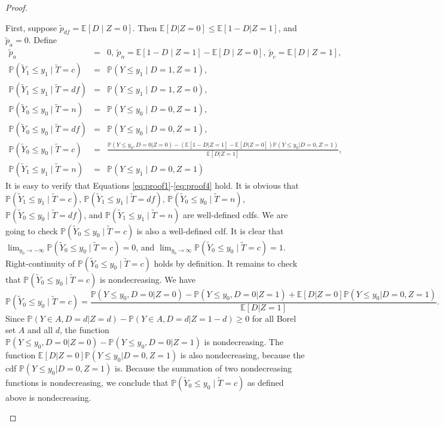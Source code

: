 \documentclass[12pt]{article}
\theoremstyle{plain}
\theoremstyle{definition}
\theoremstyle{remark}
\begin{document}
\begin{proof}
\begin{enumerate}
    First, suppose $\tilde{p}_{df}=\mathbb E[D \mid Z=0]$. Then $\mathbb{E}[D  \vert  Z=0] \leq \mathbb{E}[1-D  \vert  Z=1]$, and $\tilde{p}_a=0$. Define
\begin{eqnarray*}
\tilde{p}_a &=& 0, \ \tilde{p}_n=\mathbb E[1-D \mid Z=1]-\mathbb E[D \mid Z=0], \ \tilde{p}_c=\mathbb E[D\mid Z=1],\\
\mathbb P(\tilde{Y}_1 \leq y_1\mid \tilde{T}=c) &=& \mathbb P(Y \leq y_1 \mid D=1, Z=1),\\
\mathbb P(\tilde{Y}_1 \leq y_1\mid \tilde{T}=df) &=& \mathbb P(Y \leq y_1 \mid D=1, Z=0),\\
\mathbb P(\tilde{Y}_0 \leq y_0\mid \tilde{T}=n) &=& \mathbb P(Y \leq y_0 \mid D=0, Z=1),\\
\mathbb P(\tilde{Y}_0 \leq y_0\mid \tilde{T}=df) &=& \mathbb P(Y \leq y_0\mid D=0, Z=1),\\
\mathbb P(\tilde{Y}_0 \leq y_0\mid \tilde{T}=c) &=& \frac{\mathbb P(Y \leq y_0,D=0 \vert Z=0)-(\mathbb E[1-D \vert Z=1]-\mathbb E[D \vert Z=0])\mathbb P(Y \leq y_0\vert D=0, Z=1)}{\mathbb E[D\vert Z=1]},\\
\mathbb P(\tilde{Y}_1 \leq y_1\mid \tilde{T}=n) &=& \mathbb P(Y \leq y_1 \mid D=0, Z=1)
\end{eqnarray*}
It is easy to verify that Equations \eqref{eq:proof1}-\eqref{eq:proof4} hold. It is obvious that $\mathbb P(\tilde{Y}_1 \leq y_1\mid \tilde{T}=c)$, $\mathbb P(\tilde{Y}_1 \leq y_1\mid \tilde{T}=df)$, $\mathbb P(\tilde{Y}_0 \leq y_0\mid \tilde{T}=n)$, $\mathbb P(\tilde{Y}_0 \leq y_0\mid \tilde{T}=df)$, and $\mathbb P(\tilde{Y}_1 \leq y_1\mid \tilde{T}=n)$ are well-defined cdfs. We are going to check $\mathbb P(\tilde{Y}_0 \leq y_0\mid \tilde{T}=c)$ is also a well-defined cdf. It is clear that $\lim_{y_0 \rightarrow -\infty}\mathbb P(\tilde{Y}_0 \leq y_0\mid \tilde{T}=c)=0$, and $\lim_{y_0 \rightarrow \infty}\mathbb P(\tilde{Y}_0 \leq y_0\mid \tilde{T}=c)=1$. Right-continuity of $\mathbb P(\tilde{Y}_0 \leq y_0\mid \tilde{T}=c)$ holds by definition. It remains to check that $\mathbb P(\tilde{Y}_0 \leq y_0\mid \tilde{T}=c)$ is nondecreasing. We have
$$\mathbb P(\tilde{Y}_0 \leq y_0\mid \tilde{T}=c) = \frac{\mathbb P(Y \leq y_0,D=0 \vert Z=0)-\mathbb P(Y \leq y_0, D=0 \vert Z=1)+\mathbb E[D \vert Z=0]\mathbb P(Y \leq y_0\vert D=0, Z=1)}{\mathbb E[D\vert Z=1]}.$$
Since $\mathbb{P}(Y \in A, D=d  \vert  Z=d)-\mathbb{P}(Y \in A, D=d  \vert  Z=1-d) \geq 0$ for all Borel set $A$ and all $d$, the function $\mathbb P(Y \leq y_0,D=0 \vert Z=0)-\mathbb P(Y \leq y_0, D=0 \vert Z=1)$ is nondecreasing. The function $\mathbb E[D \vert Z=0]\mathbb P(Y \leq y_0\vert D=0, Z=1)$ is also nondecreasing, because the cdf $\mathbb P(Y \leq y_0\vert D=0, Z=1)$ is. Because the summation of two nondecreasing functions is nondecreasing, we conclude that $\mathbb P(\tilde{Y}_0 \leq y_0\mid \tilde{T}=c)$ as defined above is nondecreasing. 


\end{enumerate}
\end{proof}
\end{document}
